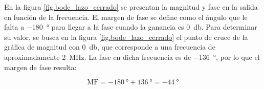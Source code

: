 
En la figura \ref{fig.bode_lazo_cerrado} se presentan la magnitud y fase en la salida en función de la frecuencia.
El margen de fase se define como el ángulo que le falta a \SI{-180}{\degree} para llegar a la fase cuando la ganancia es \SI{0}{\decibel}. Para determinar su valor, se busca en la figura \ref{fig.bode_lazo_cerrado} el punto de cruce de la gráfica de magnitud con \SI{0}{\decibel}, que corresponde a una frecuencia de aproximadamente \SI{2}{\mega\hertz}.  La fase en dicha frecuencia es de \SI{-136}{\degree}, por lo que el margen de fase resulta:

	$$ \mathrm{MF} = \SI{-180}{\degree} + \SI{136}{\degree} = \boxed{\SI{-44}{\degree}} $$
